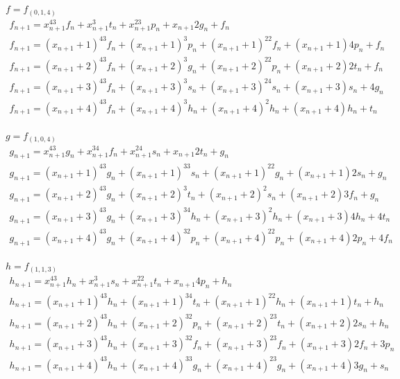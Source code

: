 \documentclass[bibliography=totoc, a4paper, 14pt]{extarticle}
\begin{document}
$f=f_{(0,1,4)}$
$$
\begin{array}{l}
f_{n+1} = x_{n+1}^43f_{n} + x_{n+1}^3t_{n} + x_{n+1}^23p_{n} + x_{n+1}2g_{n} + f_{n} \\
f_{n+1} = (x_{n+1}+1)^43f_{n} + (x_{n+1}+1)^3p_{n} + (x_{n+1}+1)^22f_{n} + (x_{n+1}+1)4p_{n} + f_{n} \\
f_{n+1} = (x_{n+1}+2)^43f_{n} + (x_{n+1}+2)^3g_{n} + (x_{n+1}+2)^22p_{n} + (x_{n+1}+2)2t_{n} + f_{n} \\
f_{n+1} = (x_{n+1}+3)^43f_{n} + (x_{n+1}+3)^3s_{n} + (x_{n+1}+3)^24s_{n} + (x_{n+1}+3)s_{n} + 4g_{n} \\
f_{n+1} = (x_{n+1}+4)^43f_{n} + (x_{n+1}+4)^3h_{n} + (x_{n+1}+4)^2h_{n} + (x_{n+1}+4)h_{n} + t_{n} \\
\end{array}
$$

$g=f_{(1,0,4)}$
$$
\begin{array}{l}
g_{n+1} = x_{n+1}^43g_{n} + x_{n+1}^34f_{n} + x_{n+1}^24s_{n} + x_{n+1}2t_{n} + g_{n} \\
g_{n+1} = (x_{n+1}+1)^43g_{n} + (x_{n+1}+1)^33s_{n} + (x_{n+1}+1)^22g_{n} + (x_{n+1}+1)2s_{n} + g_{n} \\
g_{n+1} = (x_{n+1}+2)^43g_{n} + (x_{n+1}+2)^3t_{n} + (x_{n+1}+2)^2s_{n} + (x_{n+1}+2)3f_{n} + g_{n} \\
g_{n+1} = (x_{n+1}+3)^43g_{n} + (x_{n+1}+3)^34h_{n} + (x_{n+1}+3)^2h_{n} + (x_{n+1}+3)4h_{n} + 4t_{n} \\
g_{n+1} = (x_{n+1}+4)^43g_{n} + (x_{n+1}+4)^32p_{n} + (x_{n+1}+4)^22p_{n} + (x_{n+1}+4)2p_{n} + 4f_{n} \\
\end{array}
$$

$h=f_{(1,1,3)}$
$$
\begin{array}{l}
h_{n+1} = x_{n+1}^43h_{n} + x_{n+1}^3s_{n} + x_{n+1}^22t_{n} + x_{n+1}4p_{n} + h_{n} \\
h_{n+1} = (x_{n+1}+1)^43h_{n} + (x_{n+1}+1)^34t_{n} + (x_{n+1}+1)^22h_{n} + (x_{n+1}+1)t_{n} + h_{n} \\
h_{n+1} = (x_{n+1}+2)^43h_{n} + (x_{n+1}+2)^32p_{n} + (x_{n+1}+2)^23t_{n} + (x_{n+1}+2)2s_{n} + h_{n} \\
h_{n+1} = (x_{n+1}+3)^43h_{n} + (x_{n+1}+3)^32f_{n} + (x_{n+1}+3)^23f_{n} + (x_{n+1}+3)2f_{n} + 3p_{n} \\
h_{n+1} = (x_{n+1}+4)^43h_{n} + (x_{n+1}+4)^33g_{n} + (x_{n+1}+4)^23g_{n} + (x_{n+1}+4)3g_{n} + s_{n} \\
\end{array}
$$
\end{document}
